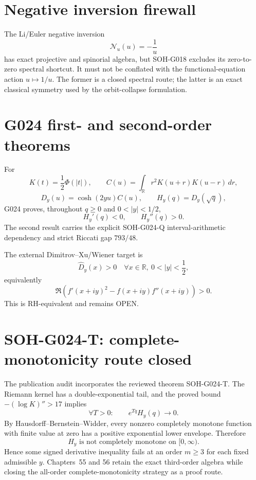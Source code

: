 \section{Negative inversion firewall}
The Li/Euler negative inversion
\[
\mathcal N_u(u)=-\frac1u
\]
has exact projective and spinorial algebra, but SOH-G018 excludes its zero-to-zero spectral shortcut. It must not be conflated with the functional-equation action $u\mapsto1/u$. The former is a closed spectral route; the latter is an exact classical symmetry used by the orbit-collapse formulation.

\section{G024 first- and second-order theorems}
For
\[
K(t)=\frac12\Phi(|t|),\qquad
C(u)=\int_{\mathbb R}r^2K(u+r)K(u-r)\,dr,
\]
\[
D_y(u)=\cosh(2yu)C(u),\qquad
H_y(q)=D_y(\sqrt q),
\]
G024 proves, throughout $q\ge0$ and $0<|y|<1/2$,
\[
\boxed{H_y'(q)<0},\qquad\boxed{H_y''(q)>0}.
\]
The second result carries the explicit SOH-G024-Q interval-arithmetic dependency and strict Riccati gap $793/48$.

The external Dimitrov--Xu/Wiener target is
\[
\boxed{\widehat D_y(x)>0\quad\forall x\in\mathbb R,\ 0<|y|<\frac12,}
\]
equivalently
\[
\boxed{\Re\!\left(f'(x+iy)^2-f(x+iy)f''(x+iy)\right)>0.}
\]
This is RH-equivalent and remains OPEN.

\section{SOH-G024-T: complete-monotonicity route closed}
The publication audit incorporates the reviewed theorem SOH-G024-T. The Riemann kernel has a double-exponential tail, and the proved bound $-(\log K)''>17$ implies
\[
\forall T>0:\qquad e^{Tq}H_y(q)\to0.
\]
By Hausdorff--Bernstein--Widder, every nonzero completely monotone function with finite value at zero has a positive exponential lower envelope. Therefore
\[
\boxed{H_y\text{ is not completely monotone on }[0,\infty).}
\]
Hence some signed derivative inequality fails at an order $m\ge3$ for each fixed admissible $y$. Chapters~55 and 56 retain the exact third-order algebra while closing the all-order complete-monotonicity strategy as a proof route.

